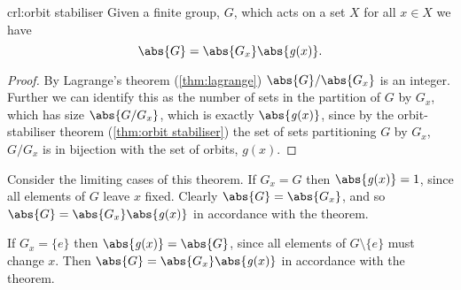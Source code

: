 \documentclass[fleqn]{NotesClass}
\newcommand{\orbit}{\mathit{g}}
\begin{document}
    \begin{crl}{}{crl:orbit stabiliser}
        Given a finite group, \(G\), which acts on a set \(X\) for all \(x \in X\) we have
        \begin{equation}
            \abs{G} = \abs{G_x} \abs{\orbit(x)}.
        \end{equation}
        \begin{proof}
            By Lagrange's theorem (\cref{thm:lagrange}) \(\abs{G}/\abs{G_x}\) is an integer.
            Further we can identify this as the number of sets in the partition of \(G\) by \(G_x\), which has size \(\abs{G/G_x}\), which is exactly \(\abs{\orbit(x)}\), since by the orbit-stabiliser theorem (\cref{thm:orbit stabiliser}) the set of sets partitioning \(G\) by \(G_x\), \(G/G_x\) is in bijection with the set of orbits, \(\orbit(x)\).
        \end{proof}
    \end{crl}
    
    Consider the limiting cases of this theorem.
    If \(G_x = G\) then \(\abs{\orbit(x)} = 1\), since all elements of \(G\) leave \(x\) fixed.
    Clearly \(\abs{G} = \abs{G_x}\), and so \(\abs{G} = \abs{G_x}\abs{\orbit(x)}\) in accordance with the theorem.
    
    If \(G_x = \{e\}\) then \(\abs{\orbit(x)} = \abs{G}\), since all elements of \(G\setminus\{e\}\) must change \(x\).
    Then \(\abs{G} = \abs{G_x}\abs{\orbit(x)}\) in accordance with the theorem.
    
\end{document}

